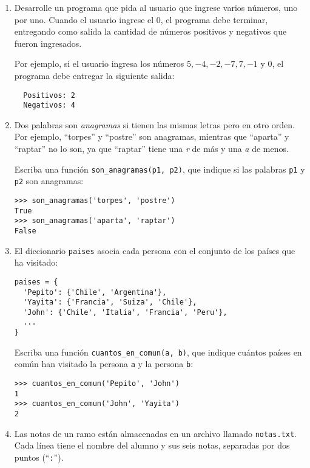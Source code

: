 \documentclass[10pt,spanish]{article}
\begin{document}
\begin{enumerate}
    \item
      Desarrolle un programa que pida al usuario
      que ingrese varios números, uno por uno.
      Cuando el usuario ingrese el 0,
      el programa debe terminar, entregando como salida
      la cantidad de números positivos y negativos que fueron ingresados.

      Por ejemplo,
      si el usuario ingresa los números
      \(5, -4, -2, -7, 7, -1\) y \(0\),
      el programa debe entregar la siguiente salida:%
      \begin{verbatim}
  Positivos: 2
  Negativos: 4
      \end{verbatim}
      \vspace{40ex}

    \item
      Dos palabras son \emph{anagramas}
      si tienen las mismas letras pero en otro orden.
      Por ejemplo, ``torpes'' y ``postre'' son anagramas,
      mientras que ``aparta'' y ``raptar'' no lo son,
      ya que ``raptar'' tiene una \emph{r} de más
      y una \emph{a} de menos.

      Escriba una función \lstinline!son_anagramas(p1, p2)!,
      que indique si las palabras \lstinline!p1! y \lstinline!p2!
      son anagramas:
      \begin{lstlisting}
>>> son_anagramas('torpes', 'postre')
True
>>> son_anagramas('aparta', 'raptar')
False
      \end{lstlisting}
      \newpage

    \item
      El diccionario \lstinline!paises! asocia cada persona
      con el conjunto de los países que ha visitado:
      \begin{lstlisting}
paises = {
  'Pepito': {'Chile', 'Argentina'},
  'Yayita': {'Francia', 'Suiza', 'Chile'},
  'John': {'Chile', 'Italia', 'Francia', 'Peru'},
  ...
}
\end{lstlisting}
      Escriba una función \lstinline!cuantos_en_comun(a, b)!,
      que indique cuántos países en común han visitado
      la persona \lstinline!a! y la persona \lstinline!b!:
      \begin{lstlisting}
>>> cuantos_en_comun('Pepito', 'John')
1
>>> cuantos_en_comun('John', 'Yayita')
2
      \end{lstlisting}


      \vspace{30ex}

    \item
      Las notas de un ramo están almacenadas
      en un archivo llamado \texttt{notas.txt}.
      Cada línea tiene el nombre del alumno y sus seis notas,
      separadas por dos puntos (``\verb!:!'').


\end{enumerate}
\end{document}
